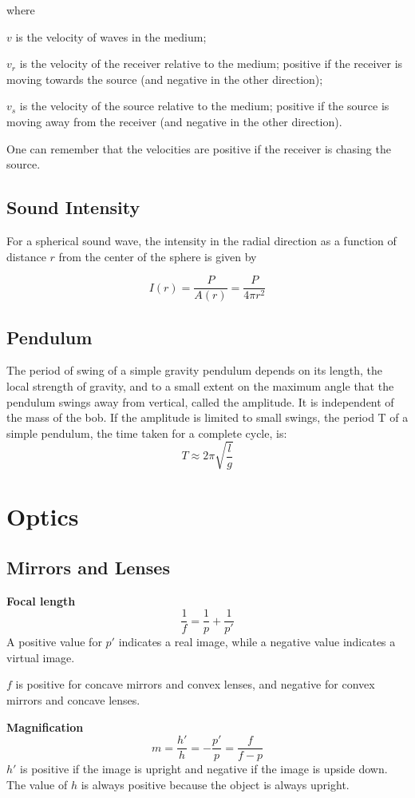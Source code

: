 \documentclass[oneside]{book}
\newcommand*\reciprocal[1]{\frac{1}{#1}}
\begin{document}
where

\(v\) is the velocity of waves in the medium;

\(v_r\) is the velocity of the receiver relative to the medium; positive if the
receiver is moving towards the source (and negative in the other direction);

\(v_s\) is the velocity of the source relative to the medium; positive if the
source is moving away from the receiver (and negative in the other direction).

One can remember that the velocities are positive if the receiver is chasing
the source.

\section{Sound Intensity}
For a spherical sound wave, the intensity in the radial direction as a function
of distance \(r\) from the center of the sphere is given by

\[I(r) = \frac{P}{A(r)} = \frac{P}{4 \pi r^2}\]

\section{Pendulum}
The period of swing of a simple gravity pendulum depends on its length, the
local strength of gravity, and to a small extent on the maximum angle that the
pendulum swings away from vertical, called the amplitude. It is independent of
the mass of the bob. If the amplitude is limited to small swings, the period T
of a simple pendulum, the time taken for a complete cycle, is:
\[T \approx 2 \pi \sqrt{\frac{l}{g}}\]

\chapter{Optics}
\section{Mirrors and Lenses}
\textbf{Focal length}
\[\reciprocal{f} = \reciprocal{p} + \reciprocal{p'}\]
A positive value for \(p'\) indicates a real image, while a negative value
indicates a virtual image.

\(f\) is positive for concave mirrors and convex lenses, and negative for convex
mirrors and concave lenses.

\textbf{Magnification}
\[m = \frac{h'}{h} = - \frac{p'}{p} = \frac{f}{f - p}\]
\(h'\) is positive if the image is upright and negative if the image is upside
down. The value of \(h\) is always positive because the object is always
upright.
\end{document}
